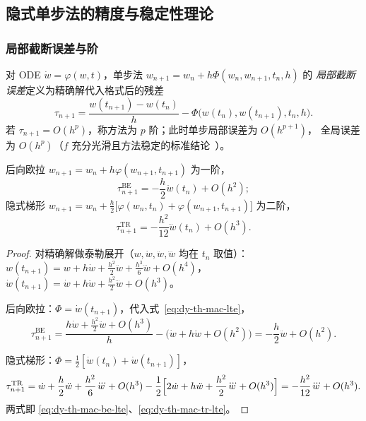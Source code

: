 \subsection{隐式单步法的精度与稳定性理论}\label{sec:dy-th-mac-stab}

\subsubsection{局部截断误差与阶}

\begin{definition}[局部截断误差与方法的阶]\label{def:dy-th-mac-lte}
对 ODE $\dot w=\varphi(w,t)$，单步法 $w_{n+1}=w_n+h\Phi(w_n,w_{n+1},t_n,h)$ 的
\emph{局部截断误差}定义为精确解代入格式后的残差
\begin{equation}
\tau_{n+1}=\frac{w(t_{n+1})-w(t_n)}{h}-\Phi\bigl(w(t_n),w(t_{n+1}),t_n,h\bigr).
\label{eq:dy-th-mac-lte}
\end{equation}
若 $\tau_{n+1}=O(h^p)$，称方法为 $p$ 阶；此时单步局部误差为 $O(h^{p+1})$，
全局误差为 $O(h^p)$（$f$ 充分光滑且方法稳定的标准结论~\cite{dym:hairer1}）。
\end{definition}

\begin{proposition}[后向欧拉与隐式梯形的局部截断误差]\label{prop:dy-th-mac-lte2}
后向欧拉 $w_{n+1}=w_n+h\varphi(w_{n+1},t_{n+1})$ 为一阶，
\begin{equation}
\tau^{\mathrm{BE}}_{n+1}=-\frac{h}{2}\ddot w(t_n)+O(h^2);
\label{eq:dy-th-mac-be-lte}
\end{equation}
隐式梯形 $w_{n+1}=w_n+\frac h2\bigl[\varphi(w_n,t_n)+\varphi(w_{n+1},t_{n+1})\bigr]$
为二阶，
\begin{equation}
\tau^{\mathrm{TR}}_{n+1}=-\frac{h^2}{12}\dddot w(t_n)+O(h^3).
\label{eq:dy-th-mac-tr-lte}
\end{equation}
\end{proposition}

\begin{proof}
对精确解做泰勒展开（$w,\dot w,\ddot w,\dddot w$ 均在 $t_n$ 取值）：
$w(t_{n+1})=w+h\dot w+\frac{h^2}{2}\ddot w+\frac{h^3}{6}\dddot w+O(h^4)$，
$\dot w(t_{n+1})=\dot w+h\ddot w+\frac{h^2}{2}\dddot w+O(h^3)$。

后向欧拉：$\Phi=\dot w(t_{n+1})$，代入式~\eqref{eq:dy-th-mac-lte}，
\begin{equation}
\tau^{\mathrm{BE}}_{n+1}
=\frac{h\dot w+\frac{h^2}{2}\ddot w+O(h^3)}{h}-\bigl(\dot w+h\ddot w+O(h^2)\bigr)
=-\frac{h}{2}\ddot w+O(h^2).
\end{equation}

隐式梯形：$\Phi=\frac12[\dot w(t_n)+\dot w(t_{n+1})]$，
\begin{equation}
\tau^{\mathrm{TR}}_{n+1}
=\dot w+\frac h2\ddot w+\frac{h^2}{6}\dddot w+O(h^3)
-\frac12\Bigl[2\dot w+h\ddot w+\frac{h^2}{2}\dddot w+O(h^3)\Bigr]
=-\frac{h^2}{12}\dddot w+O(h^3).
\end{equation}
两式即 \eqref{eq:dy-th-mac-be-lte}、\eqref{eq:dy-th-mac-tr-lte}。
\end{proof}


